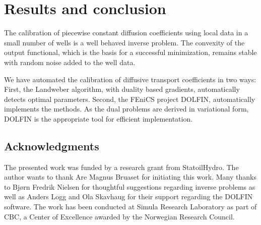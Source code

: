 \section{Results and conclusion}

The calibration of piecewise constant diffusion coefficients 
using local data in a small number of wells is a well behaved inverse problem.
The convexity of the output functional, which is the basis for a successful minimization, 
remains stable with random noise added to the well data.

We have automated the calibration of diffusive transport coefficients in two ways:
First, the Landweber algorithm, with duality based gradients, automatically detects optimal parameters.
Second, the FEniCS project DOLFIN, automatically implements the methods.
As the dual problems are derived in variational form, 
DOLFIN is the appropriate tool for efficient implementation.

\subsection*{Acknowledgments}

The presented work was funded by a research grant from StatoilHydro.
The author wants to thank Are Magnus Bruaset for initiating this work. 
Many thanks to Bj{\o}rn Fredrik Nielsen for thoughtful suggestions regarding inverse problems
as well as Anders Logg and Ola Skavhaug for their support regarding the DOLFIN software.
The work has been conducted at Simula Research Laboratory as part of CBC, 
a Center of Excellence awarded by the Norwegian Research Council.
